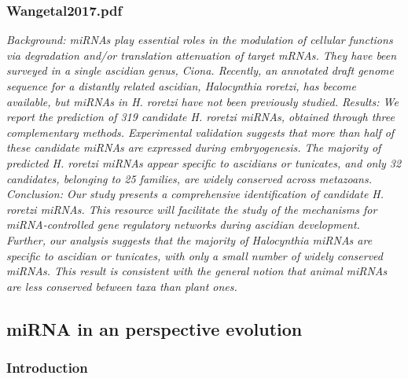 \subsubsection{Wangetal2017.pdf}
\cite{Wang2017}
\textit{Background: miRNAs play essential roles in the modulation of cellular functions via degradation and/or translation
attenuation of target mRNAs. They have been surveyed in a single ascidian genus, Ciona. Recently, an annotated
draft genome sequence for a distantly related ascidian, Halocynthia roretzi, has become available, but miRNAs in
H. roretzi have not been previously studied.
Results: We report the prediction of 319 candidate H. roretzi miRNAs, obtained through three complementary
methods. Experimental validation suggests that more than half of these candidate miRNAs are expressed during
embryogenesis. The majority of predicted H. roretzi miRNAs appear specific to ascidians or tunicates, and only 32
candidates, belonging to 25 families, are widely conserved across metazoans.
Conclusion: Our study presents a comprehensive identification of candidate H. roretzi miRNAs. This resource
will facilitate the study of the mechanisms for miRNA-controlled gene regulatory networks during ascidian
development. Further, our analysis suggests that the majority of Halocynthia miRNAs are specific to ascidian
or tunicates, with only a small number of widely conserved miRNAs. This result is consistent with the general
notion that animal miRNAs are less conserved between taxa than plant ones.}


\subsection{miRNA in an perspective evolution}

\subsubsection{Introduction}

